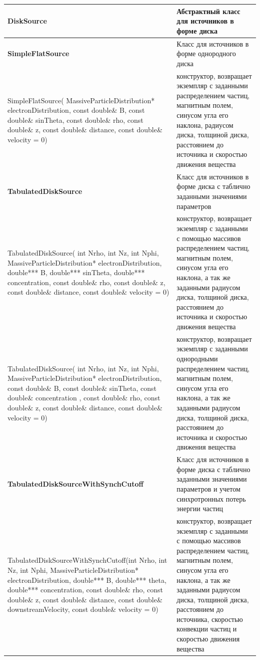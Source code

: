 \begin{small}
\begin{xtabular}{|p{0.5\textwidth}|p{0.5\textwidth}|}
		\hline
		\textbf{DiskSource} & Абстрактный класс для источников в форме диска\\
		\hline
		\textbf{SimpleFlatSource} & Класс для источников в форме однородного диска\\
		\hline
		SimpleFlatSource( MassiveParticleDistribution* electronDistribution, const double\& B, const double\& sinTheta, const double\& rho, const double\& z, const double\& distance, const double\& velocity = 0) & конструктор, возвращает экземпляр с заданными распределением частиц, магнитным полем, синусом угла его наклона, радиусом диска, толщиной диска, расстоянием до источника и скоростью движения вещества\\
		\hline
		\textbf{TabulatedDiskSource} & Класс для источников в форме диска с таблично заданными значениями параметров\\
		\hline
		TabulatedDiskSource( int Nrho, int Nz, int Nphi, MassiveParticleDistribution* electronDistribution, double*** B, double*** sinTheta, double*** concentration, const double\& rho, const double\& z, const double\& distance, const double\& velocity = 0) & конструктор, возвращает экземпляр с заданными с помощью массивов распределением частиц, магнитным полем, синусом угла его наклона, а так же заданными радиусом диска, толщиной диска, расстоянием до источника и скоростью движения вещества\\
		\hline
		TabulatedDiskSource( int Nrho, int Nz, int Nphi, MassiveParticleDistribution* electronDistribution, const double\& B, const double\& sinTheta, const double\& concentration , const double\& rho, const double\& z, const double\& distance, const double\& velocity = 0) & конструктор, возвращает экземпляр с заданными однородными распределением частиц, магнитным полем, синусом угла его наклона, а так же заданными радиусом диска, толщиной диска, расстоянием до источника и скоростью движения вещества\\
		\hline
		\textbf{TabulatedDiskSourceWithSynchCutoff} & Класс для источников в форме диска с таблично заданными значениями параметров и учетом синхротронных потерь энергии частиц\\
		\hline
		TabulatedDiskSourceWithSynchCutoff(int Nrho, int Nz, int Nphi, MassiveParticleDistribution* electronDistribution, double*** B, double*** theta, double*** concentration, const double\& rho, const double\& z, const double\& distance, const double\& downstreamVelocity, const double\& velocity = 0) &
		конструктор, возвращает экземпляр с заданными с помощью массивов распределением частиц, магнитным полем, синусом угла его наклона, а так же заданными радиусом диска, толщиной диска, расстоянием до источника, скоростью конвекции частиц и скоростью движения вещества\\

\end{xtabular}
\end{small}
